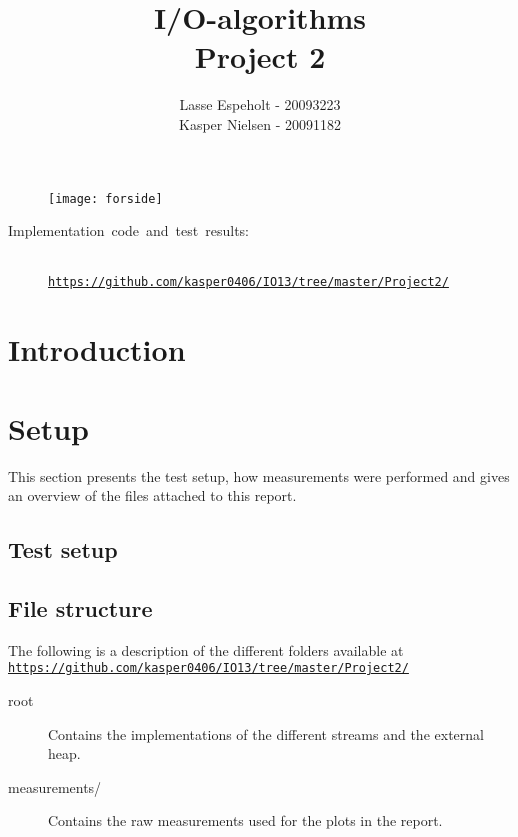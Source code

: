 \documentclass[a4paper,12pt]{article}
\begin{document}
\title{I/O-algorithms\\Project 2}

\author{Lasse Espeholt - 20093223\\
Kasper Nielsen - 20091182\\}

\maketitle
\begin{figure}[h!]
\texttt{[image: forside]}
\end{figure}

\vfill{}
\begin{description}
\item [{Implementation~code~and~test~results:}]~
\\
\texttt{\url{https://github.com/kasper0406/IO13/tree/master/Project2/}}
\end{description}
\pagebreak{}\tableofcontents{}\pagebreak{}

\section{Introduction}


\section{Setup}
This section presents the test setup, how measurements were performed
and gives an overview of the files attached to this report.

\subsection{Test setup}


\subsection{File structure}
The following is a description of the different folders available at
\\
\texttt{\url{https://github.com/kasper0406/IO13/tree/master/Project2/}}
\begin{description}
\item[root] Contains the implementations of the different streams and
  the external heap.

\item[measurements/] Contains the raw measurements used for the plots in the
  report.
\end{description}
\end{document}

